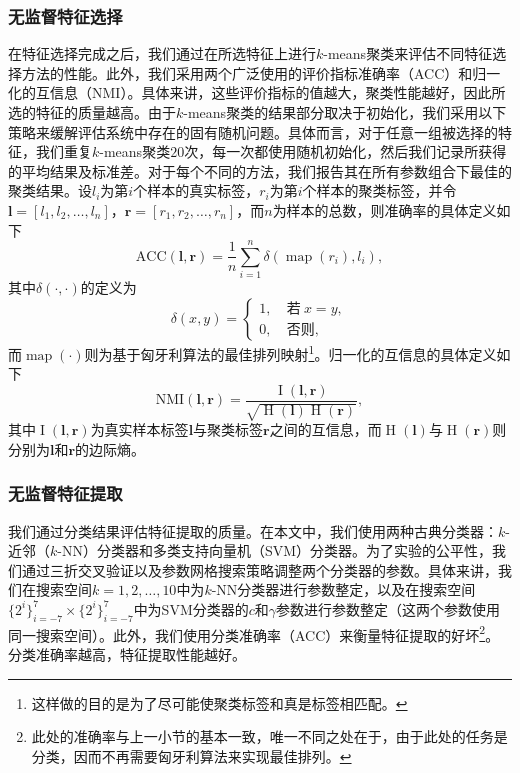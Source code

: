 \subsubsection{无监督特征选择}
在特征选择完成之后，我们通过在所选特征上进行$k$-means聚类来评估不同特征选择方法的性能。此外，我们采用两个广泛使用的评价指标准确率（ACC）和归一化的互信息（NMI）。具体来讲，这些评价指标的值越大，聚类性能越好，因此所选的特征的质量越高。由于$k$-means聚类的结果部分取决于初始化，我们采用以下策略来缓解评估系统中存在的固有随机问题。具体而言，对于任意一组被选择的特征，我们重复$k$-means聚类$20$次，每一次都使用随机初始化，然后我们记录所获得的平均结果及标准差。对于每个不同的方法，我们报告其在所有参数组合下最佳的聚类结果。设$l_i$为第$i$个样本的真实标签，$r_i$为第$i$个样本的聚类标签，并令$\boldsymbol{l}=[l_{1},l_{2},\ldots,l_{n}]$，$\boldsymbol{r}=[r_{1},r_{2},\ldots,r_{n}]$，而$n$为样本的总数，则准确率的具体定义如下
\begin{equation*}
    \text {ACC}(\boldsymbol{l}, \boldsymbol{r}) = \frac {1} { n } \sum _ { i = 1 } ^ { n } \delta \left( \operatorname { map } \left( r _ { i } \right) , l _ { i } \right) ,
\end{equation*}
其中$\delta(\cdot,\cdot)$的定义为
\begin{equation*}
    \delta(x,y)=
    \begin{cases}
      1, & ~\text{若}~x=y, \\
      0, & ~\text{否则},
    \end{cases}
\end{equation*}
而$\operatorname{map}(\cdot)$则为基于匈牙利算法的最佳排列映射\footnote{这样做的目的是为了尽可能使聚类标签和真是标签相匹配。}。归一化的互信息的具体定义如下
\begin{equation*}
\text{NMI}(\boldsymbol{l}, \boldsymbol{r})=\frac{\operatorname{I}(\boldsymbol{l}, \boldsymbol{r})}{\sqrt{\operatorname{H}(\boldsymbol{l}) \operatorname{H}(\boldsymbol{r})}},
\end{equation*}
其中$\operatorname{I}(\boldsymbol{l},\boldsymbol{r})$为真实样本标签$\boldsymbol{l}$与聚类标签$\boldsymbol{r}$之间的互信息，而$\operatorname{H}(\boldsymbol{l})$与$\operatorname{H}(\boldsymbol{r})$则分别为$\boldsymbol{l}$和$\boldsymbol{r}$的边际熵。

\subsubsection{无监督特征提取}
我们通过分类结果评估特征提取的质量。在本文中，我们使用两种古典分类器：$k$-近邻（$k$-NN）分类器和多类支持向量机（SVM）分类器。为了实验的公平性，我们通过三折交叉验证以及参数网格搜索策略调整两个分类器的参数。具体来讲，我们在搜索空间$k=1,2,\dots,10$中为$k$-NN分类器进行参数整定，以及在搜索空间$\{2^{i}\}_{i=-7}^{7}\times\{2^{i}\}_{i=-7}^{7}$中为SVM分类器的$c$和$\gamma$参数进行参数整定（这两个参数使用同一搜索空间）。此外，我们使用分类准确率（ACC）来衡量特征提取的好坏\footnote{此处的准确率与上一小节的基本一致，唯一不同之处在于，由于此处的任务是分类，因而不再需要匈牙利算法来实现最佳排列。}。分类准确率越高，特征提取性能越好。

